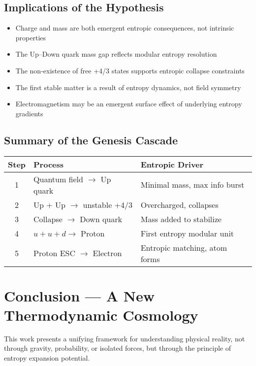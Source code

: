 \documentclass[12pt]{article}
\begin{document}
\subsection{Implications of the Hypothesis}

\begin{itemize}
    \item Charge and mass are both emergent entropic consequences, not intrinsic properties
    \item The Up–Down quark mass gap reflects modular entropy resolution
    \item The non-existence of free +4/3 states supports entropic collapse constraints
    \item The first stable matter is a result of entropy dynamics, not field symmetry
    \item Electromagnetism may be an emergent surface effect of underlying entropy gradients
\end{itemize}

\subsection*{\textbf{Summary of the Genesis Cascade}}

\vspace{0.5em}
\begin{center}
\begin{tabular}{|c|p{6.5cm}|p{6.5cm}|}
\hline
\textbf{Step} & \textbf{Process} & \textbf{Entropic Driver} \\
\hline
1 & Quantum field $\rightarrow$ Up quark & Minimal mass, max info burst \\
\hline
2 & Up + Up $\rightarrow$ unstable +4/3 & Overcharged, collapses \\
\hline
3 & Collapse $\rightarrow$ Down quark & Mass added to stabilize \\
\hline
4 & $u + u + d \rightarrow$ Proton & First entropy modular unit \\
\hline
5 & Proton ESC $\rightarrow$ Electron & Entropic matching, atom forms \\
\hline
\end{tabular}
\end{center}


\section{Conclusion — A New Thermodynamic Cosmology}

This work presents a unifying framework for understanding physical reality, not through gravity, probability, or isolated forces, but through the principle of entropy expansion potential.
\end{document}
